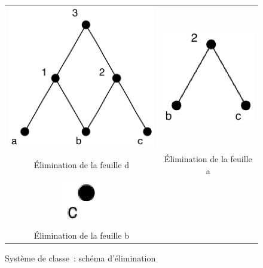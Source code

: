 \documentclass[a4paper]{report}
\begin{document}
\begin{figure}
\begin{center}
\begin{tabular}{cc}
\includegraphics[scale=.5]{images/classes3}&\includegraphics[scale=.5]{images/classes4}\\
\'Elimination de la feuille d &\'Elimination de la feuille a\\
\includegraphics[scale=.5]{images/classes5}&\\
\'Elimination de la feuille b &
\end{tabular}
\caption{Système de classe~: schéma d'élimination}
\label{sc_schema_elimination}
\end{center}

\end{figure}
\end{document}
